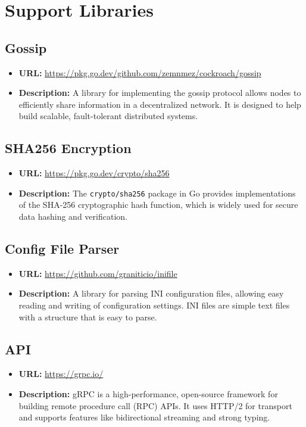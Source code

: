 \section{Support Libraries}
\subsection{Gossip}
\begin{itemize}
    \item \textbf{URL:} \url{https://pkg.go.dev/github.com/zemnmez/cockroach/gossip}
    \item \textbf{Description:} A library for implementing the gossip protocol allows nodes to efficiently share information in a decentralized network. It is designed to help build scalable, fault-tolerant distributed systems.
\end{itemize}

\subsection{SHA256 Encryption}
\begin{itemize}
    \item \textbf{URL:} \url{https://pkg.go.dev/crypto/sha256}
    \item \textbf{Description:} The \texttt{crypto/sha256} package in Go provides implementations of the SHA-256 cryptographic hash function, which is widely used for secure data hashing and verification.
\end{itemize}

\subsection{Config File Parser}
\begin{itemize}
    \item \textbf{URL:} \url{https://github.com/graniticio/inifile}
    \item \textbf{Description:} A library for parsing INI configuration files, allowing easy reading and writing of configuration settings. INI files are simple text files with a structure that is easy to parse.
\end{itemize}

\subsection{API}
\begin{itemize}
    \item \textbf{URL:} \url{https://grpc.io/}
    \item \textbf{Description:} gRPC is a high-performance, open-source framework for building remote procedure call (RPC) APIs. It uses HTTP/2 for transport and supports features like bidirectional streaming and strong typing.
\end{itemize}

